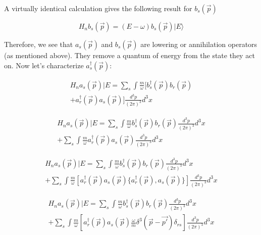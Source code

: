 \documentclass[a4]{article}
\begin{document}
    A virtually identical calculation gives the following result for $b_s (\vec{p})$

    \begin{framed}
        \begin{equation}
            H_n b_s (\vec{p}) = (E - \omega) b_s (\vec{p}) | E \rangle
        \end{equation}
    \end{framed}

    Therefore, we see that $a_s (\vec{p})$ and $b_s (\vec{p})$ are lowering or annihilation operators (as mentioned above). They remove a quantum of energy from the state
    they act on. Now let's characterize $a_s^{\dagger} (\vec{p})$:

    \begin{equation}
        \begin{aligned}
            H_n a_{s} (\vec{p}) | E = \sum_{s} \int \frac{m}{\omega} [b_s^{\dagger} (\vec{p}) b_r (\vec{p}) \\
        + a_r^{\dagger} (\vec{p}) a_s (\vec{p})] \frac{d^{3} p}{(2 \pi)^3} d^3 x
        \end{aligned}
    \end{equation}

    \begin{equation}
        \begin{aligned}
            H_n a_{s} (\vec{p}) | E = \sum_{s} \int \frac{m}{\omega} b_s^{\dagger} (\vec{p}) b_r (\vec{p}) \frac{d^{3} p}{(2 \pi)^3} d^3 x \\
        + \sum_{s} \int \frac{m}{\omega} a_r^{\dagger} (\vec{p}) a_s (\vec{p}) \frac{d^{3} p}{(2 \pi)^3} d^3 x
        \end{aligned}
    \end{equation}

    \begin{equation}
        \begin{aligned}
            H_n a_{s} (\vec{p}) | E = \sum_{s} \int \frac{m}{\omega} b_s^{\dagger} (\vec{p}) b_r (\vec{p}) \frac{d^{3} p}{(2 \pi)^3} d^3 x \\
        + \sum_{s} \int \frac{m}{\omega} [ a_r^{\dagger} (\vec{p}) a_s (\vec{p}) \{ a_r^{\dagger} (\vec{p}), a_s (\vec{p}) \} ] \frac{d^{3} p}{(2 \pi)^3} d^3 x
        \end{aligned}
    \end{equation}

    \begin{equation}
        \begin{aligned}
            H_n a_{s} (\vec{p}) | E = \sum_{s} \int \frac{m}{\omega} b_s^{\dagger} (\vec{p}) b_r (\vec{p}) \frac{d^{3} p}{(2 \pi)^3} d^3 x \\
        + \sum_{s} \int \frac{m}{\omega} [ a_r^{\dagger} (\vec{p}) a_s (\vec{p}) \frac{\omega}{m} \delta^3 (\vec{p} - \vec{p'}) \delta_{rs} ] \frac{d^{3} p}{(2 \pi)^3} d^3 x
        \end{aligned}
    \end{equation}
\end{document}
